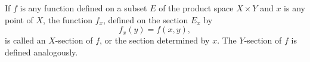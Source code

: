If $f$ is any function defined on a subset $E$ of the product space $X \times Y$ and $x$ is any point of $X$, the function $f_x$, defined on the section $E_x$ by
$$f_x(y) = f(x, y),$$
is called an $X$-section of $f$, or the section determined by $x$. The $Y$-section of $f$ is defined analogously.
